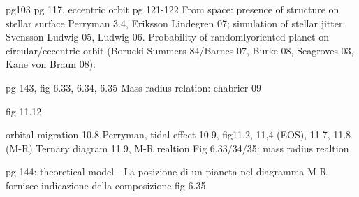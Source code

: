 \begin{workout}
pg103
pg 117, eccentric orbit pg 121-122
From space: presence of structure on stellar surface Perryman 3.4, Eriksson Lindegren 07; simulation of stellar jitter: Svensson Ludwig 05, Ludwig 06.
Probability of randomlyoriented planet on circular/eccentric orbit (Borucki Summers 84/Barnes 07, Burke 08,  Seagroves 03, Kane von Braun 08):
\end{workout}

\begin{workout}
pg 143, fig 6.33, 6.34, 6.35
Mass-radius relation: chabrier 09
\end{workout}


\begin{workout}
fig 11.12
\end{workout}


\begin{workout}[M-R diagram]
orbital migration 10.8 Perryman, tidal effect 10.9, 
fig11.2, 11,4 (EOS), 11.7, 11.8 (M-R)
Ternary diagram 11.9, M-R realtion
Fig 6.33/34/35: mass radius realtion

pg 144: theoretical model - La posizione di un pianeta nel diagramma M-R fornisce indicazione della composizione
fig 6.35
\end{workout}



